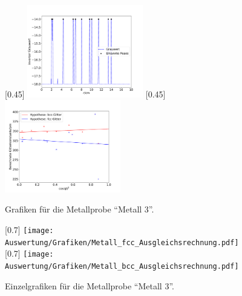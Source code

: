 \begin{figure}[h!]
  \centering
  [0.45\textwidth]{
  \centering
  \includegraphics[width=0.45\textwidth]{Auswertung/Grafiken/Metall_Peaks.pdf}
  }
  [0.45\textwidth]{
  \centering
  \includegraphics[width=0.45\textwidth]{Auswertung/Grafiken/Metall_Ausgleichsrechnung.pdf}
  }\\
  \label{Abb:Metall_Plots}
  \caption{Grafiken für die Metallprobe \enquote{Metall 3}.}
\end{figure}

\begin{figure}[p]
  \centering
  [0.7\textwidth]{
  \centering
  \texttt{[image: Auswertung/Grafiken/Metall\_fcc\_Ausgleichsrechnung.pdf]}
  }\\
  [0.7\textwidth]{
  \centering
  \texttt{[image: Auswertung/Grafiken/Metall\_bcc\_Ausgleichsrechnung.pdf]}
  }\\
  \label{Abb:Salz_Plotsa}
  \caption{Einzelgrafiken für die Metallprobe \enquote{Metall 3}.}
\end{figure}

